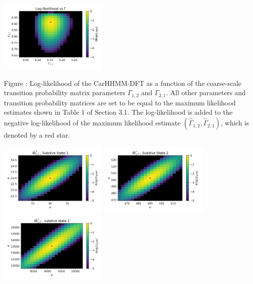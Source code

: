 \documentclass{article}
\begin{document}
        
        \begin{center}
        \includegraphics[width=2.1in]{../Plots/2019/20190902-182840-CATs_OB_1_0_267_CarHHMM2_coarse-gamma-likelihood.png}
        \end{center}
        
        \noindent Figure : Log-likelihood of the CarHHMM-DFT as a function of the coarse-scale transition probability matrix parameters $\Gamma_{1,2}$ and $\Gamma_{2,1}$. All other parameters and transition probability matrices are set to be equal to the maximum likelihood estimates shown in Table 1 of Section 3.1. The log-likelihood is added to the negative log-likelihood of the maximum likelihood estimate $(\hat \Gamma_{1,2},\hat \Gamma_{2,1})$, which is denoted by a red star.
        \addtocounter{fignum}{1}
        
        \begin{center}
        \includegraphics[width=2.1in]{../Plots/2019/20190902-182840-CATs_OB_1_0_267_CarHHMM2_fine-theta-likelihood-Ahat_low-0.png}
        \includegraphics[width=2.1in]{../Plots/2019/20190902-182840-CATs_OB_1_0_267_CarHHMM2_fine-theta-likelihood-Ahat_low-1.png}
        \includegraphics[width=2.1in]{../Plots/2019/20190902-182840-CATs_OB_1_0_267_CarHHMM2_fine-theta-likelihood-Ahat_low-2.png}
        \end{center}
        
\end{document}
